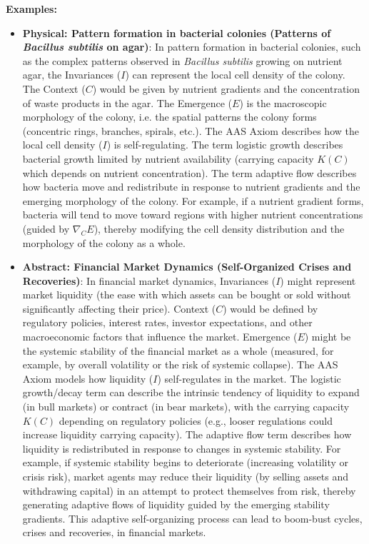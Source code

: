 \documentclass{article}
\begin{document}
\textbf{Examples:}
\begin{itemize}
\item \textbf{Physical: Pattern formation in bacterial colonies (Patterns of \textit{Bacillus subtilis} on agar)}: In pattern formation in bacterial colonies, such as the complex patterns observed in \textit{Bacillus subtilis} growing on nutrient agar, the Invariances ($I$) can represent the local cell density of the colony. The Context ($C$) would be given by nutrient gradients and the concentration of waste products in the agar. The Emergence ($E$) is the macroscopic morphology of the colony, i.e. the spatial patterns the colony forms (concentric rings, branches, spirals, etc.). The AAS Axiom describes how the local cell density ($I$) is self-regulating. The term logistic growth describes bacterial growth limited by nutrient availability (carrying capacity $K(C)$ which depends on nutrient concentration). The term adaptive flow describes how bacteria move and redistribute in response to nutrient gradients and the emerging morphology of the colony. For example, if a nutrient gradient forms, bacteria will tend to move toward regions with higher nutrient concentrations (guided by $\nabla_C E$), thereby modifying the cell density distribution and the morphology of the colony as a whole.

\item \textbf{Abstract: Financial Market Dynamics (Self-Organized Crises and Recoveries)}: In financial market dynamics, Invariances ($I$) might represent market liquidity (the ease with which assets can be bought or sold without significantly affecting their price). Context ($C$) would be defined by regulatory policies, interest rates, investor expectations, and other macroeconomic factors that influence the market. Emergence ($E$) might be the systemic stability of the financial market as a whole (measured, for example, by overall volatility or the risk of systemic collapse). The AAS Axiom models how liquidity ($I$) self-regulates in the market. The logistic growth/decay term can describe the intrinsic tendency of liquidity to expand (in bull markets) or contract (in bear markets), with the carrying capacity $K(C)$ depending on regulatory policies (e.g., looser regulations could increase liquidity carrying capacity). The adaptive flow term describes how liquidity is redistributed in response to changes in systemic stability. For example, if systemic stability begins to deteriorate (increasing volatility or crisis risk), market agents may reduce their liquidity (by selling assets and withdrawing capital) in an attempt to protect themselves from risk, thereby generating adaptive flows of liquidity guided by the emerging stability gradients. This adaptive self-organizing process can lead to boom-bust cycles, crises and recoveries, in financial markets.
\end{itemize}
\end{document}
